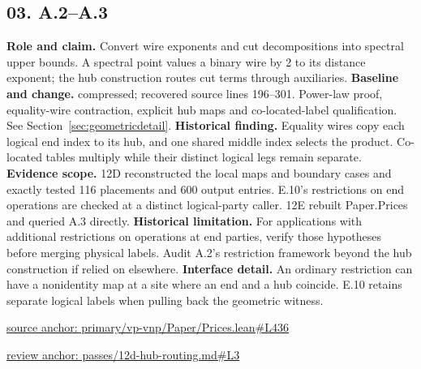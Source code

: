 \documentclass[11pt,letterpaper]{article}
\theoremstyle{definition}\newtheorem{definition}[theorem]{Definition}\newtheorem{example}[theorem]{Example}
\theoremstyle{remark}\newtheorem{remark}[theorem]{Remark}
\begin{document}
\subsection*{03. A.2–A.3}
\textbf{Role and claim.} Convert wire exponents and cut decompositions into spectral upper bounds. A spectral point values a binary wire by 2 to its distance exponent; the hub construction routes cut terms through auxiliaries.
\textbf{Baseline and change.} compressed; recovered source lines 196--301. Power-law proof, equality-wire contraction, explicit hub maps and co-located-label qualification. See Section~\ref{sec:geometricdetail}.
\textbf{Historical finding.} Equality wires copy each logical end index to its hub, and one shared middle index selects the product. Co-located tables multiply while their distinct logical legs remain separate.
\textbf{Evidence scope.} 12D reconstructed the local maps and boundary cases and exactly tested 116 placements and 600 output entries. E.10's restrictions on end operations are checked at a distinct logical-party caller. 12E rebuilt Paper.Prices and queried A.3 directly.
\textbf{Historical limitation.} For applications with additional restrictions on operations at end parties, verify those hypotheses before merging physical labels. Audit A.2's restriction framework beyond the hub construction if relied on elsewhere.
\textbf{Interface detail.} An ordinary restriction can have a nonidentity map at a site where an end and a hub coincide. E.10 retains separate logical labels when pulling back the geometric witness.
\par\href{https://github.com/nousentllc/VP-VNP-Review/blob/8a7976933b6b2b4ffda1ad3a0dfb5fc6b6f023e8/primary/vp-vnp/Paper/Prices.lean\#L436}{source anchor: primary/vp-vnp/Paper/Prices.lean\#L436}
\par\href{https://github.com/nousentllc/VP-VNP-Review/blob/8a7976933b6b2b4ffda1ad3a0dfb5fc6b6f023e8/passes/12d-hub-routing.md\#L3}{review anchor: passes/12d-hub-routing.md\#L3}
\goodbreak
\end{document}
